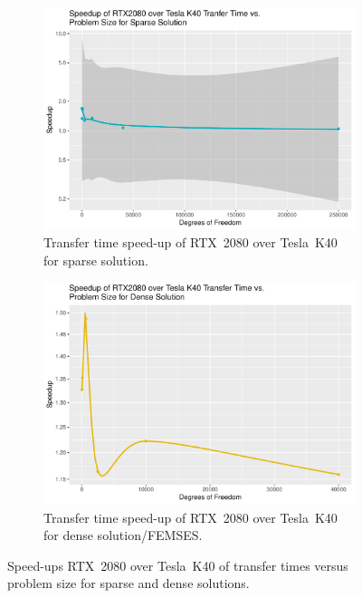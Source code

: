 \begin{figure}
	\centering
	\begin{subfigure}{0.48\linewidth}
		\centering
		\includegraphics[width = \linewidth]{Plots/transfer_sparse_rtx_speedup_vs_n}
		\caption{Transfer time speed-up of RTX~2080 over Tesla~K40 for sparse solution.}
		\label{fig:transf_rtx_sparse}
	\end{subfigure}\hfill
	\begin{subfigure}{0.48\linewidth}
		\centering
		\includegraphics[width=\linewidth]{Plots/transfer_dense_rtx_speedup_vs_n}
		\caption{Transfer time speed-up of RTX~2080 over Tesla~K40 for dense solution/FEMSES.}
		\label{fig:transf_rtx_dense}
	\end{subfigure}
	\caption{Speed-ups RTX~2080 over Tesla~K40 of transfer times versus problem size for sparse and dense solutions.}
	\label{fig:trasnf_rtx}
\end{figure}

